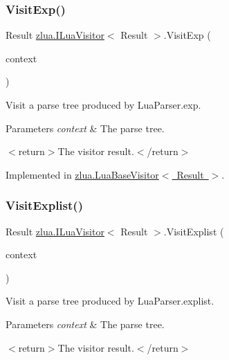 \subsubsection{\texorpdfstring{Visit\+Exp()}{VisitExp()}}
{\footnotesize\ttfamily Result \mbox{\hyperlink{interfacezlua_1_1_i_lua_visitor}{zlua.\+I\+Lua\+Visitor}}$<$ Result $>$.Visit\+Exp (\begin{DoxyParamCaption}\item[{\mbox{[}\+Not\+Null\mbox{]} \mbox{\hyperlink{classzlua_1_1_lua_parser_1_1_exp_context}{Lua\+Parser.\+Exp\+Context}}}]{context }\end{DoxyParamCaption})}



Visit a parse tree produced by Lua\+Parser.\+exp. 


\begin{DoxyParams}{Parameters}
{\em context} & The parse tree.\\
\hline
\end{DoxyParams}
$<$return$>$The visitor result.$<$/return$>$ 

Implemented in \mbox{\hyperlink{classzlua_1_1_lua_base_visitor_a0432a2115a2a561a97b72c9240082e28}{zlua.\+Lua\+Base\+Visitor$<$ Result $>$}}.

\mbox{\label{interfacezlua_1_1_i_lua_visitor_a6460b930bcd8c394def92c3cfb519d0e}} 
\subsubsection{\texorpdfstring{Visit\+Explist()}{VisitExplist()}}
{\footnotesize\ttfamily Result \mbox{\hyperlink{interfacezlua_1_1_i_lua_visitor}{zlua.\+I\+Lua\+Visitor}}$<$ Result $>$.Visit\+Explist (\begin{DoxyParamCaption}\item[{\mbox{[}\+Not\+Null\mbox{]} \mbox{\hyperlink{classzlua_1_1_lua_parser_1_1_explist_context}{Lua\+Parser.\+Explist\+Context}}}]{context }\end{DoxyParamCaption})}



Visit a parse tree produced by Lua\+Parser.\+explist. 


\begin{DoxyParams}{Parameters}
{\em context} & The parse tree.\\
\hline
\end{DoxyParams}
$<$return$>$The visitor result.$<$/return$>$ 

